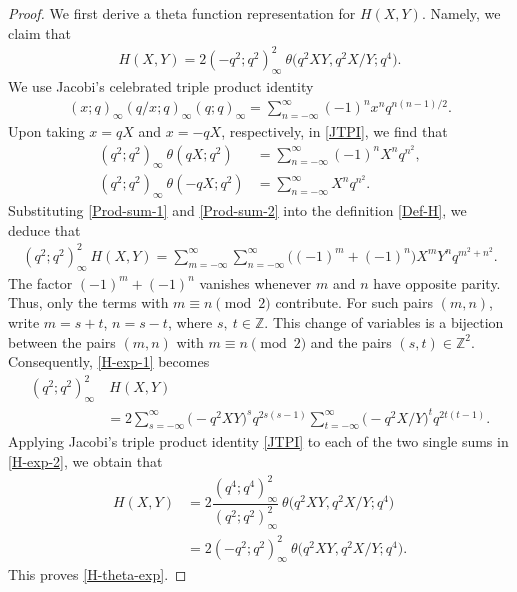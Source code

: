 \documentclass[12pt,reqno]{amsart}
\numberwithin{equation}{section}
\theoremstyle{plain}
\theoremstyle{definition}
\begin{document}
\begin{proof}
We first derive a theta function representation for $H(X,Y)$. Namely, we claim that
\begin{align}
H(X,Y)=2(-q^2;q^2)_\infty^2\!\:\theta\big(q^2XY,q^2X/Y;q^4\big).\label{H-theta-exp}
\end{align}
We use Jacobi's celebrated triple product identity \cite[p.~15, Eq.~(1.6.1)]{GR2004}
\begin{align}
(x;q)_\infty(q/x;q)_\infty(q;q)_\infty=\sum_{n=-\infty}^\infty(-1)^nx^nq^{n(n-1)/2}.
\label{JTPI}
\end{align}
Upon taking $x=qX$ and $x=-qX$, respectively, in \eqref{JTPI}, we find that
\begin{align}
(q^2;q^2)_\infty\!\:\theta(qX;q^2) &=\sum_{n=-\infty}^\infty(-1)^nX^nq^{n^2},
\label{Prod-sum-1}\\
(q^2;q^2)_\infty\!\:\theta(-qX;q^2) &=\sum_{n=-\infty}^\infty X^nq^{n^2}.
\label{Prod-sum-2}
\end{align}
Substituting \eqref{Prod-sum-1} and \eqref{Prod-sum-2} into the definition
\eqref{Def-H}, we deduce that
\begin{align}
(q^2;q^2)_\infty^2\!\:H(X,Y)=\sum_{m=-\infty}^\infty\sum_{n=-\infty}^\infty
\big((-1)^{m}+(-1)^n\big)X^{m}Y^{n}q^{m^2+n^2}.\label{H-exp-1}
\end{align}
The factor $(-1)^m+(-1)^n$ vanishes whenever $m$ and $n$ have opposite parity. Thus,
only the terms with $m\equiv n\pmod 2$ contribute. For such pairs $(m,n)$, write
$m=s+t$, $n=s-t$, where $s,\!\:t\in\mathbb{Z}$. This change of variables is a bijection
between the pairs $(m,n)$ with $m\equiv n\pmod{2}$ and the
pairs $(s,t)\in\mathbb{Z}^2$. Consequently, \eqref{H-exp-1} becomes
\begin{align}
(q^2;q^2)_\infty^2 &\!\:H(X,Y)\nonumber\\
 &=2\sum_{s=-\infty}^\infty\big({-}q^2XY\big)^{s}q^{2s(s-1)}\sum_{t=-\infty}^\infty
\big({-}q^2X/Y\big)^tq^{2t(t-1)}.\label{H-exp-2}
\end{align}
Applying Jacobi's triple product identity \eqref{JTPI} to each of the two single sums
in \eqref{H-exp-2}, we obtain that
\begin{align*}
H(X,Y) &=2\dfrac{(q^4;q^4)_\infty^2}{(q^2;q^2)_\infty^2}\!\:\theta\big(q^2XY,q^2X/Y;
q^4\big)\nonumber\\
 &=2(-q^2;q^2)_\infty^2\!\:\theta\big(q^2XY,q^2X/Y;q^4\big).
\end{align*}
This proves \eqref{H-theta-exp}.


\end{proof}
\end{document}
